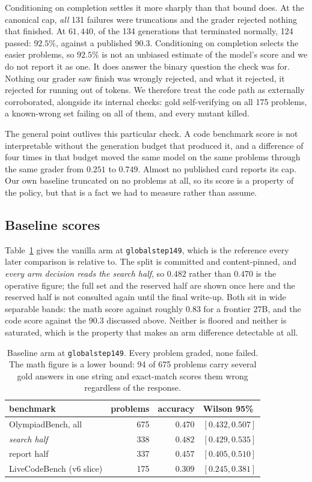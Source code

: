 Conditioning on completion settles it more sharply than that bound does. At the canonical cap,
\emph{all} 131 failures were truncations and the grader rejected nothing that finished. At
$61{,}440$, of the 134 generations that terminated normally, 124 passed: $92.5\%$, against a
published $90.3$. Conditioning on completion selects the easier problems, so $92.5\%$ is not an
unbiased estimate of the model's score and we do not report it as one. It does answer the binary
question the check was for. Nothing our grader saw finish was wrongly rejected, and what it
rejected, it rejected for running out of tokens. We therefore treat the code path as externally
corroborated, alongside its internal checks: gold self-verifying on all 175 problems, a
known-wrong set failing on all of them, and every mutant killed.

The general point outlives this particular check. A code benchmark score is not interpretable
without the generation budget that produced it, and a difference of four times in that budget
moved the same model on the same problems through the same grader from $0.251$ to $0.749$. Almost
no published card reports its cap. Our own baseline truncated on no problems at all, so its score
is a property of the policy, but that is a fact we had to measure rather than assume.

\subsection{Baseline scores}
\label{sec:baseline}

Table~\ref{tab:baseline} gives the vanilla arm at \texttt{globalstep149}, which is the
reference every later comparison is relative to. The split is committed and content-pinned, and
\emph{every arm decision reads the search half}, so $0.482$ rather than $0.470$ is the operative
figure; the full set and the reserved half are shown once here and the reserved half is not
consulted again until the final write-up. Both sit in wide separable bands: the math
score against roughly $0.83$ for a frontier 27B, and the code score against the $90.3$ discussed
above. Neither is floored and neither is saturated, which is the property that makes an arm
difference detectable at all.

\begin{table}[t]
\centering
\begin{tabular}{lrrl}
\toprule
benchmark & problems & accuracy & Wilson 95\% \\
\midrule
OlympiadBench, all & 675 & $0.470$ & $[0.432, 0.507]$ \\
\quad \emph{search half} & 338 & $\mathbf{0.482}$ & $[0.429, 0.535]$ \\
\quad report half & 337 & $0.457$ & $[0.405, 0.510]$ \\
LiveCodeBench (v6 slice) & 175 & $0.309$ & $[0.245, 0.381]$ \\
\bottomrule
\end{tabular}
\caption{Baseline arm at \texttt{globalstep149}. Every problem graded, none failed. The math
figure is a lower bound: 94 of 675 problems carry several gold answers in one string and
exact-match scores them wrong regardless of the response.}
\label{tab:baseline}
\end{table}

